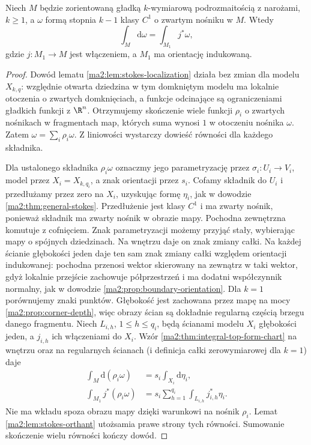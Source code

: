 \begin{twierdzenie}
\label{ma2:thm:stokes-corners}
Niech $M$ będzie zorientowaną gładką
$k$-wymiarową podrozmaitością z narożami,
$k\ge1$, a $\omega$ formą stopnia $k-1$
klasy $C^1$ o zwartym nośniku w $M$.
Wtedy
\[
 \int_M\mathrm d\omega=\int_{M_1}j^*\omega,
\]
gdzie $j:M_1\to M$ jest włączeniem,
a $M_1$ ma orientację indukowaną.
\end{twierdzenie}
\begin{proof}
Dowód lematu \ref{ma2:lem:stokes-localization}
działa bez zmian dla modelu $X_{k,q}$:
względnie otwarta dziedzina w tym domkniętym
modelu ma lokalnie otoczenia o zwartych
domknięciach, a funkcje odcinające są
ograniczeniami gładkich funkcji z $\R^n$.
Otrzymujemy skończenie wiele funkcji $\rho_i$
o zwartych nośnikach w fragmentach map,
których suma wynosi $1$ w otoczeniu
nośnika $\omega$.
Zatem $\omega=\sum_i\rho_i\omega$.
Z liniowości wystarczy dowieść równości
dla każdego składnika.

Dla ustalonego składnika $\rho_i\omega$
oznaczmy jego parametryzację przez
$\sigma_i:U_i\to V_i$, model przez $X_i=X_{k,q_i}$,
a znak orientacji przez $s_i$.
Cofamy składnik do $U_i$ i przedłużamy
przez zero na $X_i$, uzyskując formę $\eta_i$,
jak w dowodzie
\ref{ma2:thm:general-stokes}.
Przedłużenie jest klasy $C^1$ i ma zwarty
nośnik, ponieważ składnik ma zwarty nośnik
w obrazie mapy. Pochodna zewnętrzna
komutuje z cofnięciem.
Znak parametryzacji możemy przyjąć stały,
wybierając mapy o spójnych dziedzinach.
Na wnętrzu daje on znak zmiany całki.
Na każdej ścianie głębokości jeden daje
ten sam znak zmiany całki względem orientacji
indukowanej: pochodna przenosi wektor
skierowany na zewnątrz w taki wektor,
gdyż lokalnie przejście zachowuje półprzestrzeń
i ma dodatni współczynnik normalny,
jak w dowodzie \ref{ma2:prop:boundary-orientation}.
Dla $k=1$ porównujemy znaki punktów.
Głębokość jest zachowana przez mapę na mocy
\ref{ma2:prop:corner-depth}, więc obrazy
ścian są dokładnie regularną częścią
brzegu danego fragmentu.
Niech $L_{i,h}$, $1\le h\le q_i$, będą ścianami
modelu $X_i$ głębokości jeden, a $j_{i,h}$
ich włączeniami do $X_i$. Wzór
\ref{ma2:thm:integral-top-form-chart}
na wnętrzu oraz na regularnych ścianach
(i definicja całki zerowymiarowej dla $k=1$)
daje
\[
 \begin{aligned}
 \int_M\mathrm d(\rho_i\omega)
 &=s_i\int_{X_i}\mathrm d\eta_i,\\
 \int_{M_1}j^*(\rho_i\omega)
 &=s_i\sum_{h=1}^{q_i}
       \int_{L_{i,h}}j_{i,h}^*\eta_i .
 \end{aligned}
\]
Nie ma wkładu spoza obrazu mapy dzięki
warunkowi na nośnik $\rho_i$.
Lemat \ref{ma2:lem:stokes-orthant}
utożsamia prawe strony tych równości.
Sumowanie skończenie wielu równości
kończy dowód.
\end{proof}


